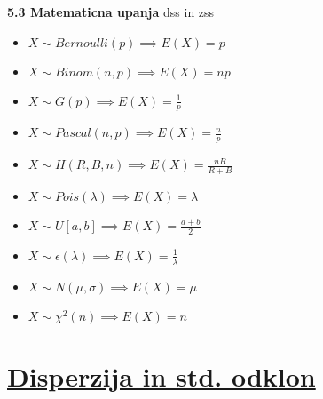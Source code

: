 \documentclass{article}
\begin{document}
\begin{multicols}{2}
\textbf{5.3 Matematicna upanja} dss in zss
\begin{itemize}
    \item \begin{math}
        X \sim Bernoulli(p) \implies E(X) = p
    \end{math}
    \item \begin{math}
        X \sim Binom(n, p) \implies E(X) = np
    \end{math}
    \item \begin{math}
        X \sim G(p) \implies E(X) = \frac{1}{p}
    \end{math}
    \item \begin{math}
        X \sim Pascal(n, p) \implies E(X) = \frac{n}{p}
    \end{math}
    \item
    \begin{math}
        X \sim H(R, B, n) \implies E(X) = \frac{nR}{R + B}
    \end{math}
    \item \begin{math}
        X \sim Pois(\lambda) \implies E(X) = \lambda
    \end{math}
    \item \begin{math}
        X \sim U[a, b] \implies E(X) = \frac{a + b}{2}
    \end{math}
    \item  \begin{math}
        X \sim \epsilon(\lambda) \implies E(X) = \frac{1}{\lambda}
    \end{math}
    \item \begin{math}
        X \sim N(\mu, \sigma ) \implies E(X) = \mu
    \end{math}
    \item \begin{math}
        X \sim \chi^{2}(n) \implies E(X) = n
    \end{math}
\end{itemize}

\section{\underline{Disperzija in std. odklon}}


\end{multicols}
\end{document}
